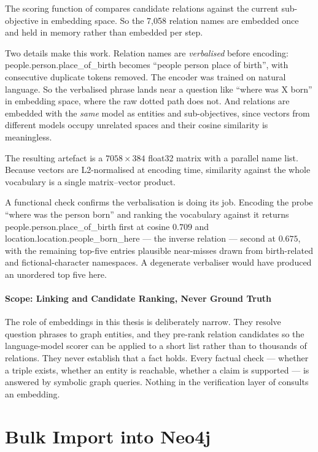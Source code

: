 The scoring function of  compares candidate relations against
the current sub-objective in embedding space. So the 7{,}058 relation names are
embedded once and held in memory rather than embedded per step.

Two details make this work. Relation names are \emph{verbalised} before
encoding: \textsf{people.\allowbreak person.\allowbreak place\_of\_birth}
becomes ``people person place of birth'', with consecutive duplicate tokens
removed. The encoder was trained on natural language. So the verbalised phrase
lands near a question like ``where was X born'' in embedding space, where the
raw dotted path does not. And relations are embedded with the \emph{same} model
as entities and sub-objectives, since vectors from different models occupy
unrelated spaces and their cosine similarity is meaningless.

The resulting artefact is a $7058 \times 384$ float32 matrix with a parallel
name list. Because vectors are L2-normalised at encoding time, similarity
against the whole vocabulary is a single matrix--vector product.

A functional check confirms the verbalisation is doing its job. Encoding the
probe ``where was the person born'' and ranking the vocabulary against it
returns \textsf{people.person.place\_of\_birth} first at cosine $0.709$ and
\textsf{location.location.people\_born\_here} --- the inverse relation ---
second at $0.675$, with the remaining top-five entries plausible near-misses
drawn from birth-related and fictional-character namespaces. A degenerate
verbaliser would have produced an unordered top five here.

\paragraph{Scope: Linking and Candidate Ranking, Never Ground
Truth}\label{sec:embedding-scope}

The role of embeddings in this thesis is deliberately narrow. They resolve
question phrases to graph entities, and they pre-rank relation candidates so the
language-model scorer can be applied to a short list rather than to thousands of
relations. They never establish that a fact holds. Every factual check ---
whether a triple exists, whether an entity is reachable, whether a claim is
supported --- is answered by symbolic graph queries. Nothing in the verification
layer of  consults an embedding.


\section{Bulk Import into Neo4j}\label{app:bulk-import}

